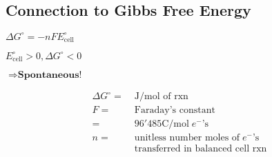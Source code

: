 \subsection{Connection to Gibbs Free Energy}
    \begin{minipage}{0.99\linewidth}
        \begin{minipage}{0.35\linewidth}
            \centerline{$\Delta G^\circ = -n F E^\circ_\text{cell}$}
            \vspace*{2em}
            \centerline{$E^\circ_\text{cell} > 0, \Delta G^\circ < 0$}
            \vspace*{0.5em}
            \centerline{$\Rightarrow \textbf{Spontaneous!}$}
        \end{minipage}
        \begin{minipage}{0.7\linewidth}
            \begin{align*}
                \Delta G^\circ =& \; \textrm{J/mol of rxn}\\
                F =& \; \textrm{Faraday's constant}\\
                =& \; 96'485 \textrm{C/mol} \; e^- \textrm{'s}\\
                n =& \; \textrm{unitless number moles of} \; e^- \textrm{'s}\\
                & \; \textrm{transferred in balanced cell rxn}\\
            \end{align*}
        \end{minipage}
    \end{minipage}